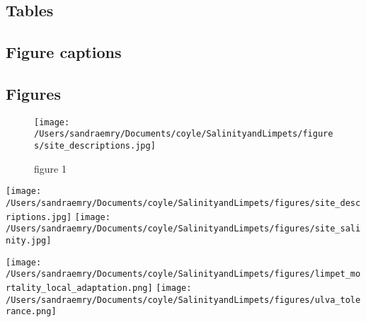 \documentclass[
  11pt,
]{article}
\begin{document}
\hypertarget{tables}{%
\subsection{Tables}\label{tables}}

\hypertarget{figure-captions}{%
\subsection{Figure captions}\label{figure-captions}}

\hypertarget{figures}{%
\subsection{Figures}\label{figures}}

\begin{figure}
  \texttt{[image: /Users/sandraemry/Documents/coyle/SalinityandLimpets/figures/site\_descriptions.jpg]}
  \caption{figure 1}
\end{figure}

\texttt{[image: /Users/sandraemry/Documents/coyle/SalinityandLimpets/figures/site\_descriptions.jpg]}
\texttt{[image: /Users/sandraemry/Documents/coyle/SalinityandLimpets/figures/site\_salinity.jpg]}

\texttt{[image: /Users/sandraemry/Documents/coyle/SalinityandLimpets/figures/limpet\_mortality\_local\_adaptation.png]}
\texttt{[image: /Users/sandraemry/Documents/coyle/SalinityandLimpets/figures/ulva\_tolerance.png]}
\end{document}

